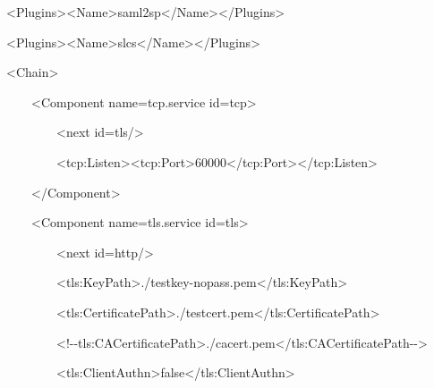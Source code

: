 \documentclass{article}
\begin{document}
{\ttfamily\color{black}
\ \ \ \ {\textless}Plugins{\textgreater}{\textless}Name{\textgreater}saml2sp{\textless}/Name{\textgreater}{\textless}/Plugins{\textgreater}
}

{\ttfamily\color{black}
\ \ \ \ {\textless}Plugins{\textgreater}{\textless}Name{\textgreater}slcs{\textless}/Name{\textgreater}{\textless}/Plugins{\textgreater}
}

{\ttfamily\color{black}
\ \ \ \ {\textless}Chain{\textgreater} }

{\ttfamily\color{black}
\ \ \ \ \ \ \ \ {\textless}Component
name={\textquotedbl}tcp.service{\textquotedbl}
id={\textquotedbl}tcp{\textquotedbl}{\textgreater} }

{\ttfamily\color{black}
\ \ \ \ \ \ \ \ \ \ \ \ {\textless}next
id={\textquotedbl}tls{\textquotedbl}/{\textgreater} }

{\ttfamily\color{black}
\ \ \ \ \ \ \ \ \ \ \ \ {\textless}tcp:Listen{\textgreater}{\textless}tcp:Port{\textgreater}60000{\textless}/tcp:Port{\textgreater}{\textless}/tcp:Listen{\textgreater}
}

{\ttfamily\color{black}
\ \ \ \ \ \ \ \ {\textless}/Component{\textgreater} }

{\ttfamily\color{black}
\ \ \ \ \ \ \ \ {\textless}Component
name={\textquotedbl}tls.service{\textquotedbl}
id={\textquotedbl}tls{\textquotedbl}{\textgreater} }

{\ttfamily\color{black}
\ \ \ \ \ \ \ \ \ \ \ \ {\textless}next
id={\textquotedbl}http{\textquotedbl}/{\textgreater} }

{\ttfamily\color{black}
\ \ \ \ \ \ \ \ \ \ \ \ {\textless}tls:KeyPath{\textgreater}./testkey-nopass.pem{\textless}/tls:KeyPath{\textgreater}
}

{\ttfamily\color{black}
\ \ \ \ \ \ \ \ \ \ \ \ {\textless}tls:CertificatePath{\textgreater}./testcert.pem{\textless}/tls:CertificatePath{\textgreater}
}

{\ttfamily\color{black}
\ \ \ \ \ \ \ \ \ \ \ \ {\textless}!-{}-tls:CACertificatePath{\textgreater}./cacert.pem{\textless}/tls:CACertificatePath-{}-{\textgreater}
}

{\ttfamily\color{black}
\ \ \ \ \ \ \ \ \ \ \ \ {\textless}tls:ClientAuthn{\textgreater}false{\textless}/tls:ClientAuthn{\textgreater}
}
\end{document}
